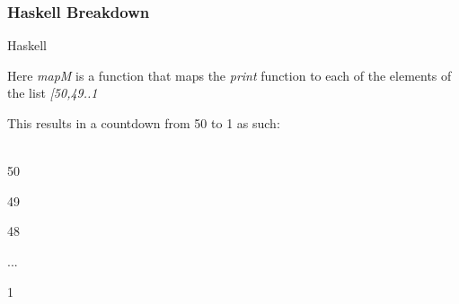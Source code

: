 \documentclass{beamer}
\begin{document}
\begin{frame}
  \frametitle{Haskell Breakdown}
  \begin{block}{Haskell}
    
  \end{block}

  Here \textit{mapM\textunderscore} is a function that maps the \textit{print} function to each of the elements of the list \textit{[50,49..1}

  This results in a countdown from 50 to 1 as such:
  \begin{texttt}\\
  50

  49

  48

  ...

  1
  \end{texttt}
\end{frame}
\end{document}
